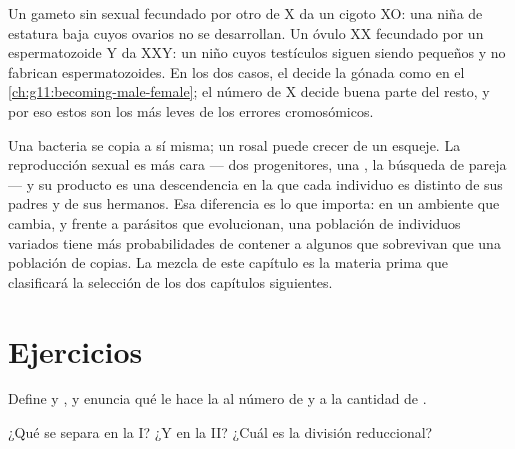 \begin{example}\label{ex:g12:meiosis-genetic-shuffling:sexchrom}
Un gameto sin  sexual fecundado por otro  de X da un
cigoto XO: una niña de estatura baja cuyos ovarios no se desarrollan.
Un óvulo XX fecundado por un espermatozoide Y da XXY: un niño cuyos
testículos siguen siendo pequeños y no fabrican espermatozoides. En los
dos casos, el  decide la gónada como en el
\cref{ch:g11:becoming-male-female}; el número de  X decide
buena parte del resto, y por eso estos son los más leves de los errores
cromosómicos.
\end{example}

\begin{remark}\label{rem:g12:meiosis-genetic-shuffling:whysex}
Una bacteria se copia a sí misma; un rosal puede crecer de un esqueje.
La reproducción sexual es más cara --- dos progenitores, una ,
la búsqueda de pareja --- y su producto es una descendencia en la que
cada individuo es distinto de sus padres y de sus hermanos. Esa
diferencia es lo que importa: en un ambiente que cambia, y frente a
parásitos que evolucionan, una población de individuos variados tiene
más probabilidades de contener a algunos que sobrevivan que una
población de copias. La mezcla de este capítulo es la materia prima que
clasificará la selección de los dos capítulos siguientes.
\end{remark}

\section{Ejercicios}

\begin{exercise}[$\star$]\label{exo:g12:meiosis-genetic-shuffling:1}
Define  y , y enuncia qué le hace la  al número
de  y a la cantidad de .
\end{exercise}

\begin{exercise}[$\star$]\label{exo:g12:meiosis-genetic-shuffling:2}
¿Qué se separa en la  I? ¿Y en la  II? ¿Cuál es la
división reduccional?
\end{exercise}

